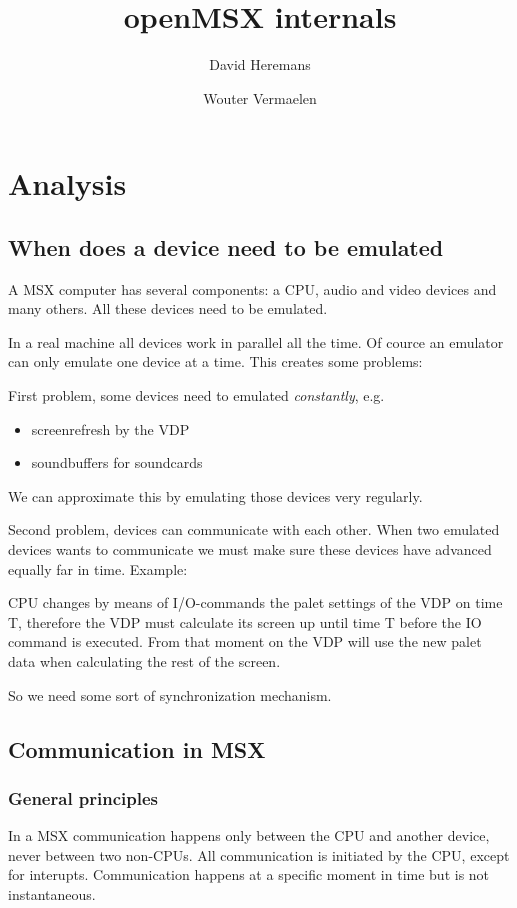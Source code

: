 \documentclass[11pt, a4paper]{report}
\title{openMSX internals}
\author{David Heremans}
\author{Wouter Vermaelen}
\begin{document}
\maketitle
\tableofcontents

\chapter{Analysis}

\section{When does a device need to be emulated}

A MSX computer has several components: a CPU, audio and video devices and
many others. All these devices need to be emulated.

In a real machine all devices work in parallel all the time. Of cource an
emulator can only emulate one device at a time. This creates some problems:

First problem, some devices need to emulated \textit{constantly}, e.g.
\begin{itemize}
\item screenrefresh by the VDP
\item soundbuffers for soundcards
\end{itemize}
We can approximate this by emulating those devices very regularly.

Second problem, devices can communicate with each other. When two emulated
devices wants to communicate we must make sure these devices have advanced
equally far in time. Example:

CPU changes by means of I/O-commands the palet settings of the VDP on
time T, therefore the VDP must calculate its screen up until time T before
the IO command is executed. From that moment on the VDP will use the new
palet data when calculating the rest of the screen.

So we need some sort of synchronization mechanism.


\section{Communication in MSX}

\subsection{General principles}

In a MSX communication happens only between the CPU and another device, never
between two non-CPUs. All communication is initiated by the CPU, except for
interupts. Communication happens at a specific moment in time but is not
instantaneous.
\end{document}
